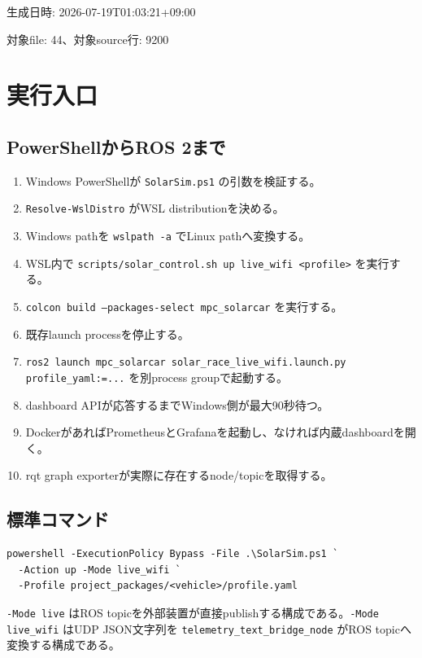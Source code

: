 \documentclass[a4paper,10pt,oneside]{book}
\begin{document}
\frontmatter
\begin{titlepage}\centering\vspace*{25mm}{\Huge\bfseries ソーラーカーEMS\\live / live\_wifi\\実装・計算完全解説\par}\vspace{12mm}{\Large PowerShell入口から速度指令まで\par}\vfill
{\large 生成日時: 2026-07-19T01:03:21+09:00\par}
{\large 対象file: 44、対象source行: 9200\par}
\end{titlepage}
\tableofcontents
\mainmatter

\chapter{実行入口}
\section{PowerShellからROS 2まで}
\begin{enumerate}[leftmargin=2.4em]
\item Windows PowerShellが \texttt{SolarSim.ps1} の引数を検証する。
\item \texttt{Resolve-WslDistro} がWSL distributionを決める。
\item Windows pathを \texttt{wslpath -a} でLinux pathへ変換する。
\item WSL内で \texttt{scripts/solar\_control.sh up live\_wifi <profile>} を実行する。
\item \texttt{colcon build --packages-select mpc\_solarcar} を実行する。
\item 既存launch processを停止する。
\item \texttt{ros2 launch mpc\_solarcar solar\_race\_live\_wifi.launch.py profile\_yaml:=...} を別process groupで起動する。
\item dashboard APIが応答するまでWindows側が最大90秒待つ。
\item DockerがあればPrometheusとGrafanaを起動し、なければ内蔵dashboardを開く。
\item rqt graph exporterが実際に存在するnode/topicを取得する。
\end{enumerate}

\section{標準コマンド}
\begin{lstlisting}
powershell -ExecutionPolicy Bypass -File .\SolarSim.ps1 `
  -Action up -Mode live_wifi `
  -Profile project_packages/<vehicle>/profile.yaml
\end{lstlisting}
\texttt{-Mode live} はROS topicを外部装置が直接publishする構成である。\texttt{-Mode live\_wifi} はUDP JSON文字列を \texttt{telemetry\_text\_bridge\_node} がROS topicへ変換する構成である。
\end{document}
